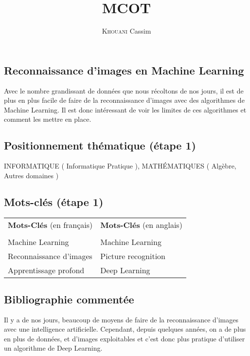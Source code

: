 \documentclass[a4paper,11pt]{report}
\title{MCOT}
\author{\textsc{Khouani} Cassim}
\begin{document}
\begin{center}
\section*{Reconnaissance d'images en Machine Learning}
\end{center}

Avec le nombre grandissant de données que nous récoltons de nos jours, il est de plus en plus facile de faire de la reconnaissance d’images avec des algorithmes de Machine Learning. Il est donc intéressant de voir les limites de ces algorithmes et comment les mettre en place.\\

\subsection*{Positionnement thématique (étape 1)}

\begin{it}
INFORMATIQUE ( Informatique Pratique ), MATHÉMATIQUES ( Algèbre, Autres domaines )
\end{it}

\subsection*{Mots-clés (étape 1)}

\begin{tabular}{ll}  %

\textbf{Mots-Clés} (en français) & \textbf{Mots-Clés} (en anglais) \\
\\
Machine Learning & Machine Learning \\
Reconnaissance d'images & Picture recognition\\
Apprentissage profond & Deep Learning

\end{tabular}

\subsection*{Bibliographie commentée}

Il y a de nos jours, beaucoup de moyens de faire de la reconnaissance d’images avec une intelligence artificielle. Cependant, depuis quelques années, on a de plus en plus de données, et d’images exploitables et c’est donc plus pratique d’utiliser un algorithme de Deep Learning. \cite{ref1} \\
\end{document}
